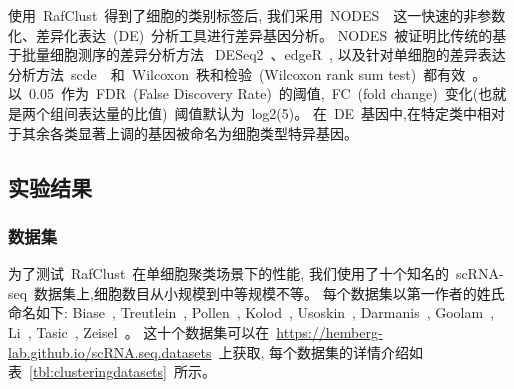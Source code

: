 使用~RafClust~得到了细胞的类别标签后,
我们采用~NODES~\cite{Sengupta049734}~这一快速的非参数化、差异化表达~(DE)~分析工具进行差异基因分析。
NODES~被证明比传统的基于批量细胞测序的差异分析方法~DESeq2~\cite{love2014moderated}、edgeR~\cite{robinson2010edger},
以及针对单细胞的差异表达分析方法~scde~\cite{kharchenko2014bayesian}~和~Wilcoxon~秩和检验~(Wilcoxon rank sum test)~都有效~\cite{Sengupta049734}。
以~0.05~作为~FDR~(False Discovery Rate)~的阈值,~FC~(fold change)~变化(也就是两个组间表达量的比值)~阈值默认为~log2(5)。
在~DE~基因中,在特定类中相对于其余各类显著上调的基因被命名为细胞类型特异基因。


\subsection{实验结果}

\subsubsection{数据集}
\label{subsec:datasets} 

为了测试~RafClust~在单细胞聚类场景下的性能,
我们使用了十个知名的~scRNA-seq~数据集上,细胞数目从小规模到中等规模不等。
每个数据集以第一作者的姓氏命名如下: 
Biase~\cite{biase2014cell},
Treutlein~\cite{treutlein2014reconstructing}, 
Pollen~\cite{pollen2014low}, 
Kolod~\cite{kolodziejczyk2015single}, 
Usoskin~\cite{usoskin2015unbiased}, 
Darmanis~\cite{darmanis2015survey}, 
Goolam~\cite{goolam2016heterogeneity}, 
Li~\cite{li2017reference},
Tasic~\cite{tasic2016adult}, 
Zeisel~\cite{zeisel2015cell}。
这十个数据集可以在~\url{https://hemberg-lab.github.io/scRNA.seq.datasets}~上获取, 
每个数据集的详情介绍如表~\ref{tbl:clusteringdatasets}~所示。

